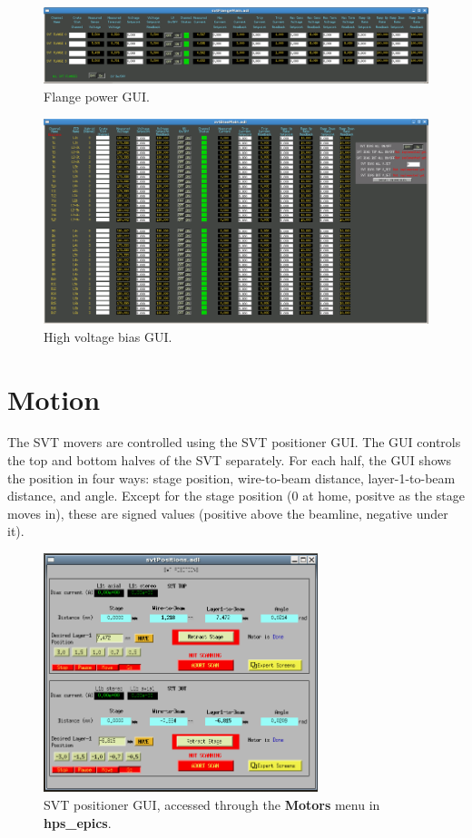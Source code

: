 \documentclass[12pt]{report}
\begin{document}
\begin{figure}[h!t]
\centering
\includegraphics[width=14cm]{svtFlange.png}
\caption{Flange power GUI. \label{fig:svtFlange}}
\end{figure}

\begin{figure}[h!]
\centering
\includegraphics[width=14cm]{svtBias.png}
\caption{High voltage bias GUI. \label{fig:svtBias}}
\end{figure}



\section{Motion}

The SVT movers are controlled using the SVT positioner GUI.
The GUI controls the top and bottom halves of the SVT separately.
For each half, the GUI shows the position in four ways: stage position, wire-to-beam distance, layer-1-to-beam distance, and angle. Except for the stage position (0 at home, positve as the stage moves in), these are signed values (positive above the beamline, negative under it).

\begin{figure}[h!t!]
\centering
\includegraphics[width=8cm]{svt_movers.png}
\caption{SVT positioner GUI, accessed through the \textbf{Motors} menu in \textbf{hps\_epics}.}
\label{mover}
\end{figure}
\end{document}

